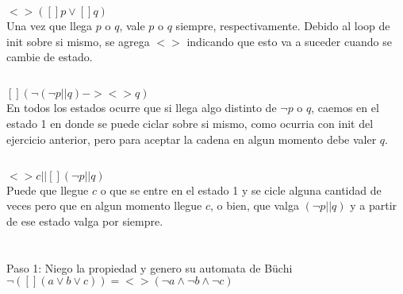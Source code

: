 \section{}
\subsection{}
$<>([]p \lor []q)$ \\

Una vez que llega $p$ o $q$, vale $p$ o $q$ siempre, respectivamente. Debido al loop de init sobre si mismo, se agrega $<>$ indicando que esto va a suceder cuando se cambie de estado. 

\subsection{}
$[] ( \neg (\neg p || q) -> <>q)$ \\

En todos los estados ocurre que si llega algo distinto de $\neg p$ o $q$, caemos en el estado 1 en donde se puede ciclar sobre si mismo, como ocurria con init del ejercicio anterior, pero para aceptar la cadena en algun momento debe valer $q$.

\subsection{}
$<>c || [] (\neg p || q)$ \\

Puede que llegue $c$ o que se entre en el estado 1 y se cicle alguna cantidad de veces pero que en algun momento llegue $c$, o bien, que valga $(\neg p || q)$ y a partir de ese estado valga por siempre.

\section{}
\subsection{}
\subsubsection{}
Paso 1: Niego la propiedad y genero su automata de Büchi \\

$\neg ([](a \lor b \lor c)) = <>(\neg a \land \neg b \land \neg c)$ \\



